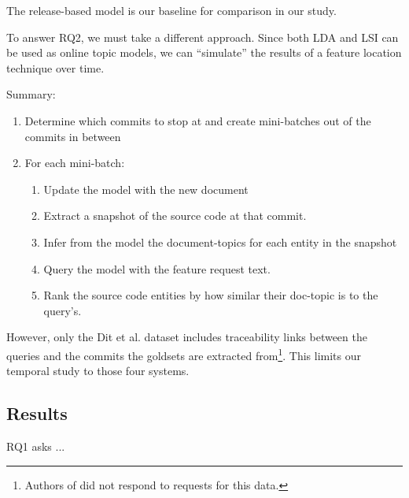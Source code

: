The release-based model is our baseline for comparison in our study.

To answer RQ2, we must take a different approach.
Since both LDA and LSI can be used as online topic models, we can
``simulate'' the results of a feature location technique over time.

Summary:
\begin{enumerate}
    \item Determine which commits to stop at and create mini-batches out of the commits in between
    \item For each mini-batch:
    \begin{enumerate}
        \item Update the model with the new document
        \item Extract a snapshot of the source code at that commit.
        \item Infer from the model the document-topics for each entity in the snapshot
        \item Query the model with the feature request text.
        \item Rank the source code entities by how similar their doc-topic is to the query's.
    \end{enumerate}
\end{enumerate}


However, only the Dit et al. dataset includes traceability links between
the queries and the commits the goldsets are extracted from\footnote{
Authors of \cite{Moreno:2014} did not respond to requests for this data.}.
This limits our temporal study to those four systems.


\subsection{Results}

RQ1 asks ...
